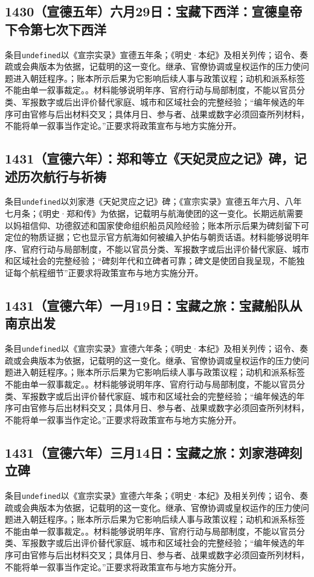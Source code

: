 \subsection{1430（宣德五年）六月29日：宝藏下西洋：宣德皇帝下令第七次下西洋}
条目\texttt{undefined}以《宣宗实录》宣德五年条；《明史·本纪》及相关列传；诏令、奏疏或会典版本为依据，记载明的这一变化。继承、官僚协调或皇权运作的压力使问题进入朝廷程序。；账本所示后果为它影响后续人事与政策议程；动机和派系标签不能由单一叙事裁定。。材料能够说明年序、官府行动与局部制度，不能以官员分类、军报数字或后出评价替代家庭、城市和区域社会的完整经验；“编年候选的年序可由官修与后出材料交叉；具体月日、参与者、战果或数字必须回查所列材料，不能将单一叙事当作定论。”正要求将政策宣布与地方实施分开。

\subsection{1431（宣德六年）：郑和等立《天妃灵应之记》碑，记述历次航行与祈祷}
条目\texttt{undefined}以刘家港《天妃灵应之记》碑；《宣宗实录》宣德五年六月、八年七月条；《明史·郑和传》为依据，记载明与航海使团的这一变化。长期远航需要以妈祖信仰、功德叙述和国家使命组织船员风险经验；账本所示后果为碑刻留下可定位的物质证据；它也显示官方航海如何被编入护佑与朝贡话语。材料能够说明年序、官府行动与局部制度，不能以官员分类、军报数字或后出评价替代家庭、城市和区域社会的完整经验；“碑刻年代和立碑者可靠；碑文是使团自我呈现，不能独证每个航程细节”正要求将政策宣布与地方实施分开。

\subsection{1431（宣德六年）一月19日：宝藏之旅：宝藏船队从南京出发}
条目\texttt{undefined}以《宣宗实录》宣德六年条；《明史·本纪》及相关列传；诏令、奏疏或会典版本为依据，记载明的这一变化。继承、官僚协调或皇权运作的压力使问题进入朝廷程序。；账本所示后果为它影响后续人事与政策议程；动机和派系标签不能由单一叙事裁定。。材料能够说明年序、官府行动与局部制度，不能以官员分类、军报数字或后出评价替代家庭、城市和区域社会的完整经验；“编年候选的年序可由官修与后出材料交叉；具体月日、参与者、战果或数字必须回查所列材料，不能将单一叙事当作定论。”正要求将政策宣布与地方实施分开。

\subsection{1431（宣德六年）三月14日：宝藏之旅：刘家港碑刻立碑}
条目\texttt{undefined}以《宣宗实录》宣德六年条；《明史·本纪》及相关列传；诏令、奏疏或会典版本为依据，记载明的这一变化。继承、官僚协调或皇权运作的压力使问题进入朝廷程序。；账本所示后果为它影响后续人事与政策议程；动机和派系标签不能由单一叙事裁定。。材料能够说明年序、官府行动与局部制度，不能以官员分类、军报数字或后出评价替代家庭、城市和区域社会的完整经验；“编年候选的年序可由官修与后出材料交叉；具体月日、参与者、战果或数字必须回查所列材料，不能将单一叙事当作定论。”正要求将政策宣布与地方实施分开。

